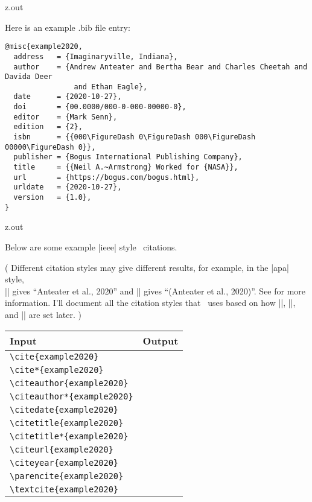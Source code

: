 \begin{VerbatimOut}{z.out}

Here is an example .bib file entry:

{\footnotesize
\begin{verbatim}
@misc{example2020,
  address   = {Imaginaryville, Indiana},
  author    = {Andrew Anteater and Bertha Bear and Charles Cheetah and Davida Deer
                and Ethan Eagle},
  date      = {2020-10-27},
  doi       = {00.0000/000-0-000-00000-0},
  editor    = {Mark Senn},
  edition   = {2},
  isbn      = {{000\FigureDash 0\FigureDash 000\FigureDash 00000\FigureDash 0}},
  publisher = {Bogus International Publishing Company},
  title     = {{Neil A.~Armstrong} Worked for {NASA}},
  url       = {https://bogus.com/bogus.html},
  urldate   = {2020-10-27},
  version   = {1.0},
}
\end{verbatim}
}
\end{VerbatimOut}

\MyIO


\begin{VerbatimOut}{z.out}

Below are some example |ieee| style \BibLaTeXLogo\ citations.
  
(%
  Different citation styles may give different results,
  for example,
  in the |apa| style,\\
  |\cite{example2020}|
  gives
  ``Anteater et al., 2020''
  and
  |\parencite{example2020}|
  gives
  ``(Anteater et al., 2020)''.
  See
  \cite{apa-style-examples}
  for more information.
  I'll document all the citation styles
  that \PurdueThesisLogo\ uses based on how
  |\ZZinstitution|,
  |\ZZcampus|,
  and |\ZZprogram| are set later.%
)

\begin{inlinetable}
  \begin{tabular}{@{}ll@{}}
    \toprule
    \textbf{Input}&                   \textbf{Output}\\
    \midrule
    \verb+\cite{example2020}+&        \cite{example2020}\\
    \verb+\cite*{example2020}+&       \cite*{example2020}\\
    \verb+\citeauthor{example2020}+&  \citeauthor{example2020}\\
    \verb+\citeauthor*{example2020}+& \citeauthor*{example2020}\\
    \verb+\citedate{example2020}+&    \citedate{example2020}\\
    \verb+\citetitle{example2020}+&   \citetitle{example2020}\\
    \verb+\citetitle*{example2020}+&  \citetitle*{example2020}\\
    \verb+\citeurl{example2020}+&     \citeurl{example2020}\\
    \verb+\citeyear{example2020}+&    \citeyear{example2020}\\
    \verb+\parencite{example2020}+&   \parencite{example2020}\\
    \verb+\textcite{example2020}+&    \textcite{example2020}\\
    \bottomrule
  \end{tabular}
\end{inlinetable}
\end{VerbatimOut}

\MyIO
